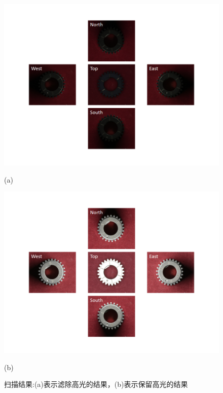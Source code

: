 \begin{figure}[htbp]
\centering
	\begin{minipage}[]{1.0\linewidth}
	\centerline{\includegraphics[width=1\linewidth]{figures/capturea.png}}
	\centerline{
		\footnotesize{(a)}}
	\label{caputurea}
	\end{minipage}
	\begin{minipage}[]{1.0\linewidth}
	\vspace{-1pt}
	\centerline{\includegraphics[width=1\linewidth]{figures/captureb.png}}
	\centerline{
		\footnotesize{(b)}
	}
	\label{caputureb}
	\end{minipage}
\caption{扫描结果:(a)表示滤除高光的结果，(b)表示保留高光的结果}
\label{caputure}
\vspace{-5pt}
\end{figure}

